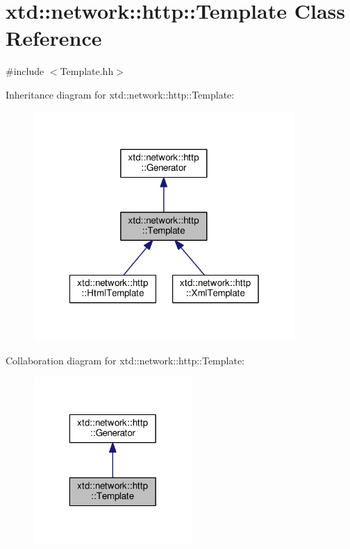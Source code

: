 \hypertarget{classxtd_1_1network_1_1http_1_1Template}{\section{xtd\-:\-:network\-:\-:http\-:\-:Template Class Reference}
\label{classxtd_1_1network_1_1http_1_1Template}
}


{\ttfamily \#include $<$Template.\-hh$>$}



Inheritance diagram for xtd\-:\-:network\-:\-:http\-:\-:Template\-:
\nopagebreak
\begin{figure}[H]
\begin{center}
\leavevmode
\includegraphics[width=283pt]{classxtd_1_1network_1_1http_1_1Template__inherit__graph}
\end{center}
\end{figure}


Collaboration diagram for xtd\-:\-:network\-:\-:http\-:\-:Template\-:
\nopagebreak
\begin{figure}[H]
\begin{center}
\leavevmode
\includegraphics[width=172pt]{classxtd_1_1network_1_1http_1_1Template__coll__graph}
\end{center}
\end{figure}
